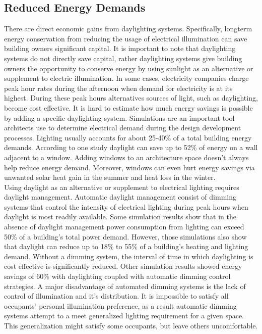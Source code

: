   \subsection{Reduced Energy Demands}
    There are direct economic gains from daylighting systems. 
    Specifically, longterm energy conservation from reducing the usage of electrical illumination can save building owners significant capital.
    It is important to note that daylighting systems do not directly save capital, rather daylighting systems give building owners the opportunity to conserve energy by using sunlight as an alternative or supplement to electric illumination. In some cases, electricity companies charge peak hour rates during the afternoon when demand for electricity is at its highest. During these peak hours alternatives sources of light, such as daylighting, become cost effective.
    It is hard to estimate how much energy savings is possible by adding a specific daylighting system. Simulations are an important tool architects use to determine electrical demand during the design development processes.  Lighting usually accounts for about 25-40\% of a total building energy demands.
    According to one study daylight can save up to 52\% of energy on a wall adjacent to a window\cite{Leslie}.
    Adding windows to an architecture space doesn't always help reduce energy demand. Moreover, windows can even hurt energy savings via unwanted solar heat gain in the summer and heat loss in the winter. %
    \\

    Using daylight as an alternative or supplement to electrical lighting requires daylight management. Automatic daylight management consist of dimming systems that control the intensity of electrical lighting during peak hours when daylight is most readily available.  Some simulation results show that in the absence of daylight management power consumption from lighting can exceed 50\% of a building's total power demand.
    However, those simulations also show that daylight can reduce up to 18\% to 55\% of a building's heating and lighting demand\cite{Bodart}.
    Without a dimming system, the interval of time in which daylighting is cost effective is significantly reduced. Other simulation results showed energy savings of 60\% with daylighting coupled with automatic dimming control strategies\cite{Ihm}. 
    A major disadvantage of automated dimming systems is the lack of control of illumination and it's distribution. It is impossible to satisfy all occupants' personal illumination preference, as a result automatic dimming systems attempt to a meet generalized lighting requirement for a given space. This generalization might satisfy some occupants, but leave others uncomfortable.\\ 

